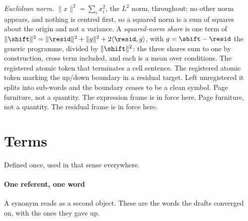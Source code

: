 \begin{description}[labelwidth=5em, leftmargin=6em, labelsep=0.6em,
                    style=multiline, font=\normalfont, itemsep=0.5ex]
 \emph{Euclidean norm.} $\lVert x\rVert^{2}
  = \sum_i x_i^{2}$, the $L^{2}$ norm, throughout; no other norm appears, and
  nothing is centred first, so a squared norm is a sum of squares about the
  origin and not a variance. A \emph{squared-norm share} is one term of
  $\lVert\shift\rVert^{2} = \lVert\resid\rVert^{2} + \lVert g\rVert^{2}
  + 2\langle\resid,g\rangle$, with $g = \shift - \resid$ the generic programme,
  divided by $\lVert\shift\rVert^{2}$: the three shares sum to one by
  construction, cross term included, and each is a mean over conditions.
 The registered atomic token that terminates a cell
  sentence.
 The registered atomic token marking the up\slash down
  boundary in a residual target. Left unregistered it splits into sub-words and
  the boundary ceases to be a clean symbol.
 Page furniture, not a quantity. The expression frame
  is in force here.
 Page furniture, not a quantity. The residual frame is
  in force here.
\end{description}

\section*{Terms}

\noindent
Defined once, used in that sense everywhere.

\paragraph{One referent, one word} A synonym reads as a second object. These
are the words the drafts converged on, with the ones they gave up.


